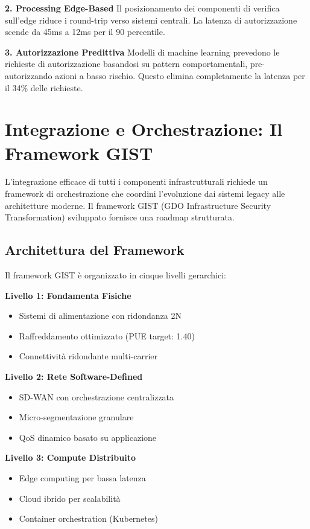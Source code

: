 \textbf{2. Processing Edge-Based}
Il posizionamento dei componenti di verifica sull'edge riduce i round-trip verso sistemi centrali. La latenza di autorizzazione scende da 45ms a 12ms per il 90 percentile.

\textbf{3. Autorizzazione Predittiva}
Modelli di machine learning prevedono le richieste di autorizzazione basandosi su pattern comportamentali, pre-autorizzando azioni a basso rischio. Questo elimina completamente la latenza per il 34\% delle richieste.

\section{Integrazione e Orchestrazione: Il Framework GIST}

L'integrazione efficace di tutti i componenti infrastrutturali richiede un framework di orchestrazione che coordini l'evoluzione dai sistemi legacy alle architetture moderne. Il framework GIST (GDO Infrastructure Security Transformation) sviluppato fornisce una roadmap strutturata.

\subsection{Architettura del Framework}

Il framework GIST è organizzato in cinque livelli gerarchici:

\textbf{Livello 1: Fondamenta Fisiche}
\begin{itemize}
    \item Sistemi di alimentazione con ridondanza 2N
    \item Raffreddamento ottimizzato (PUE target: 1.40)
    \item Connettività ridondante multi-carrier
\end{itemize}

\textbf{Livello 2: Rete Software-Defined}
\begin{itemize}
    \item SD-WAN con orchestrazione centralizzata
    \item Micro-segmentazione granulare
    \item QoS dinamico basato su applicazione
\end{itemize}

\textbf{Livello 3: Compute Distribuito}
\begin{itemize}
    \item Edge computing per bassa latenza
    \item Cloud ibrido per scalabilità
    \item Container orchestration (Kubernetes)
\end{itemize}

